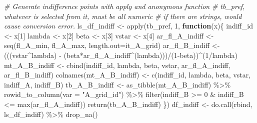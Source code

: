 \documentclass[
]{book}
\newenvironment{Shaded}{\begin{snugshade}}{\end{snugshade}}
\newcommand{\AttributeTok}[1]{\textcolor[rgb]{0.77,0.63,0.00}{#1}}
\newcommand{\CommentTok}[1]{\textcolor[rgb]{0.56,0.35,0.01}{\textit{#1}}}
\newcommand{\ControlFlowTok}[1]{\textcolor[rgb]{0.13,0.29,0.53}{\textbf{#1}}}
\newcommand{\DecValTok}[1]{\textcolor[rgb]{0.00,0.00,0.81}{#1}}
\newcommand{\FunctionTok}[1]{\textcolor[rgb]{0.00,0.00,0.00}{#1}}
\newcommand{\NormalTok}[1]{#1}
\newcommand{\OtherTok}[1]{\textcolor[rgb]{0.56,0.35,0.01}{#1}}
\newcommand{\SpecialCharTok}[1]{\textcolor[rgb]{0.00,0.00,0.00}{#1}}
\newcommand{\StringTok}[1]{\textcolor[rgb]{0.31,0.60,0.02}{#1}}
\begin{document}
\begin{Shaded}
\begin{Highlighting}[]
\CommentTok{\# Generate indifference points with apply and anonymous function}
\CommentTok{\# tb\_pref, whatever is selected from it, must be all numeric}
\CommentTok{\# if there are strings, would cause conversion error.}
\NormalTok{ls\_df\_indiff }\OtherTok{\textless{}{-}} \FunctionTok{apply}\NormalTok{(tb\_pref, }\DecValTok{1}\NormalTok{, }\ControlFlowTok{function}\NormalTok{(x)\{}
\NormalTok{  indiff\_id }\OtherTok{\textless{}{-}}\NormalTok{ x[}\DecValTok{1}\NormalTok{]}
\NormalTok{  lambda }\OtherTok{\textless{}{-}}\NormalTok{ x[}\DecValTok{2}\NormalTok{]}
\NormalTok{  beta }\OtherTok{\textless{}{-}}\NormalTok{ x[}\DecValTok{3}\NormalTok{]}
\NormalTok{  vstar }\OtherTok{\textless{}{-}}\NormalTok{ x[}\DecValTok{4}\NormalTok{]}
\NormalTok{  ar\_fl\_A\_indiff }\OtherTok{\textless{}{-}} \FunctionTok{seq}\NormalTok{(fl\_A\_min, fl\_A\_max, }\AttributeTok{length.out=}\NormalTok{it\_A\_grid)}
\NormalTok{  ar\_fl\_B\_indiff }\OtherTok{\textless{}{-}}\NormalTok{ (((vstar}\SpecialCharTok{\^{}}\NormalTok{lambda) }\SpecialCharTok{{-}}
\NormalTok{                        (beta}\SpecialCharTok{*}\NormalTok{ar\_fl\_A\_indiff}\SpecialCharTok{\^{}}\NormalTok{(lambda)))}\SpecialCharTok{/}\NormalTok{(}\DecValTok{1}\SpecialCharTok{{-}}\NormalTok{beta))}\SpecialCharTok{\^{}}\NormalTok{(}\DecValTok{1}\SpecialCharTok{/}\NormalTok{lambda)}
\NormalTok{  mt\_A\_B\_indiff }\OtherTok{\textless{}{-}} \FunctionTok{cbind}\NormalTok{(indiff\_id, lambda, beta, vstar,}
\NormalTok{                         ar\_fl\_A\_indiff, ar\_fl\_B\_indiff)}
  \FunctionTok{colnames}\NormalTok{(mt\_A\_B\_indiff) }\OtherTok{\textless{}{-}} \FunctionTok{c}\NormalTok{(}\StringTok{\textquotesingle{}indiff\_id\textquotesingle{}}\NormalTok{, }\StringTok{\textquotesingle{}lambda\textquotesingle{}}\NormalTok{, }\StringTok{\textquotesingle{}beta\textquotesingle{}}\NormalTok{, }\StringTok{\textquotesingle{}vstar\textquotesingle{}}\NormalTok{,}
                               \StringTok{\textquotesingle{}indiff\_A\textquotesingle{}}\NormalTok{, }\StringTok{\textquotesingle{}indiff\_B\textquotesingle{}}\NormalTok{)}
\NormalTok{  tb\_A\_B\_indiff }\OtherTok{\textless{}{-}} \FunctionTok{as\_tibble}\NormalTok{(mt\_A\_B\_indiff) }\SpecialCharTok{\%\textgreater{}\%}
    \FunctionTok{rowid\_to\_column}\NormalTok{(}\AttributeTok{var =} \StringTok{"A\_grid\_id"}\NormalTok{) }\SpecialCharTok{\%\textgreater{}\%}
    \FunctionTok{filter}\NormalTok{(indiff\_B }\SpecialCharTok{\textgreater{}=} \DecValTok{0} \SpecialCharTok{\&}\NormalTok{ indiff\_B }\SpecialCharTok{\textless{}=} \FunctionTok{max}\NormalTok{(ar\_fl\_A\_indiff))}
  \FunctionTok{return}\NormalTok{(tb\_A\_B\_indiff)}
\NormalTok{\})}
\NormalTok{df\_indiff }\OtherTok{\textless{}{-}} \FunctionTok{do.call}\NormalTok{(rbind, ls\_df\_indiff) }\SpecialCharTok{\%\textgreater{}\%} \FunctionTok{drop\_na}\NormalTok{()}
\end{Highlighting}
\end{Shaded}
\end{document}
